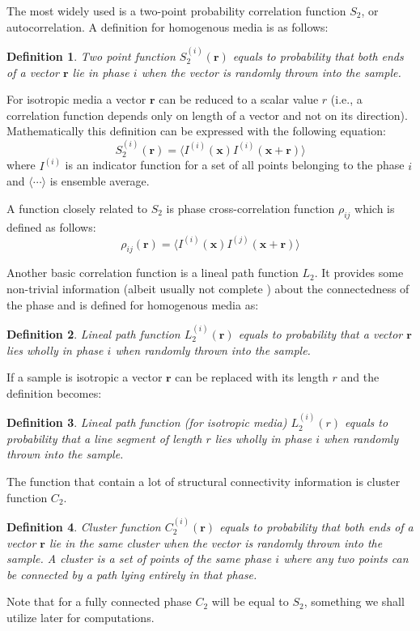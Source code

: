\documentclass[1p]{elsarticle}
\newtheorem{definition}{Definition}
\begin{document}
The most widely used is a two-point probability correlation function $S_2$, or
autocorrelation. A definition for homogenous media is as follows:
\begin{definition}
  Two point function $S_2^{(i)}(\bm{r})$ equals to probability that both ends
  of a vector $\bm{r}$ lie in phase $i$ when the vector is randomly thrown
  into the sample.
\end{definition}
For isotropic media a vector $\bm{r}$ can be reduced to a scalar value
$r$ (i.e., a correlation function depends only on length of a vector and not on
its direction). Mathematically this definition can be expressed with the
following equation:
\begin{equation}
  S_2^{(i)}(\bm{r}) = \langle I^{(i)}(\bm{x}) I^{(i)}(\bm{x} +
  \bm{r}) \rangle
  \label{eq:s2-def}
\end{equation}
where $I^{(i)}$ is an indicator function for a set of all points belonging to
the phase $i$ and $\langle \cdots \rangle$ is ensemble average.

A function closely related to $S_2$ is phase cross-correlation function
$\rho_{ij}$ which is defined as follows:
\begin{equation}
  \rho_{ij}(\bm{r}) = \langle I^{(i)}(\bm{x}) I^{(j)}(\bm{x} +
  \bm{r}) \rangle
  \label{eq:cross-def}
\end{equation}

Another basic correlation function is a lineal path function $L_2$. It provides
some non-trivial information (albeit usually not complete
\cite{vcapek2011transport}) about the connectedness of the phase and is defined
for homogenous media as:
\begin{definition}
  Lineal path function $L_2^{(i)}(\bm{r})$ equals to probability that a
  vector $\bm{r}$ lies wholly in phase $i$ when randomly thrown into the
  sample.
\end{definition}
If a sample is isotropic a vector $\bm{r}$ can be replaced with its length
$r$ and the definition becomes:
\begin{definition}
  Lineal path function (for isotropic media) $L_2^{(i)}(r)$ equals to
  probability that a line segment of length $r$ lies wholly in phase $i$ when
  randomly thrown into the sample.
\end{definition}

The function that contain a lot of structural connectivity information \cite{JiaoPNAS}
is cluster function $C_2$.
\begin{definition}
  Cluster function $C_2^{(i)}(\bm{r})$ equals to probability that both
  ends of a vector $\bm{r}$ lie in the same cluster when the vector is
  randomly thrown into the sample. A cluster is a set of points of the same
  phase $i$ where any two points can be connected by a path lying entirely in
  that phase.
\end{definition}
Note that for a fully connected phase $C_2$ will be equal to $S_2$, something
we shall utilize later for computations.
\end{document}
